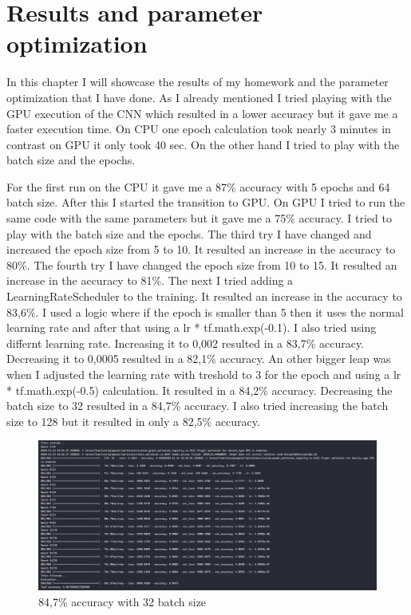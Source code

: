 \documentclass[11pt,a4paper,oneside]{report}
\begin{document}
\chapter{Results and parameter optimization}

In this chapter I will showcase the results of my homework and the parameter optimization that I have done.
As I already mentioned I tried playing with the GPU execution of the CNN which resulted in a lower accuracy but it gave me a faster execution time. On CPU one epoch calculation took nearly 3 minutes in contrast on GPU it only took 40 sec.
On the other hand I tried to play with the batch size and the epochs.

For the first run on the CPU it gave me a 87\% accuracy with 5 epochs and 64 batch size. After this I started the transition to GPU.
On GPU I tried to run the same code with the same parameters but it gave me a 75\% accuracy. I tried to play with the batch size and the epochs.
The third try I have changed and increased the epoch size from 5 to 10. It resulted an increase in the accuracy to 80\%.
The fourth try I have changed the epoch size from 10 to 15. It resulted an increase in the accuracy to 81\%.
The next I tried adding a LearningRateScheduler to the training. It resulted an increase in the accuracy to 83,6\%. I used a logic where if the epoch is smaller than 5 then it uses the normal learning rate and after that using a lr * tf.math.exp(-0.1).
I also tried using differnt learning rate. Increasing it to 0,002 resulted in a 83,7\% accuracy. Decreasing it to 0,0005 resulted in a 82,1\% accuracy.
An other bigger leap was when I adjusted the learning rate with treshold to 3 for the epoch and using a lr * tf.math.exp(-0.5) calculation. It resulted in a 84,2\% accuracy.
Decreasing the batch size to 32 resulted in a 84,7\% accuracy. I also tried increasing the batch size to 128 but it resulted in only a 82,5\% accuracy.

\begin{figure}[h]
  \caption{84,7\% accuracy with 32 batch size}
  \centering
  \includegraphics[width=\textwidth]{best}
\end{figure}
\end{document}
